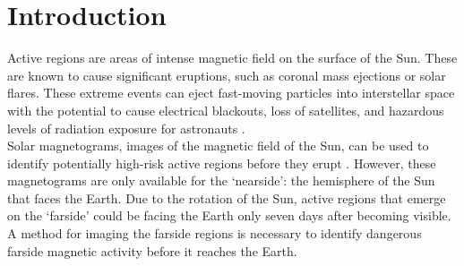 \documentclass[11pt,a4paper,onecolumn]{report}
\begin{document}





\tableofcontents









%
%
%
%
\chapter{Introduction}
%
%
%
%

Active regions are areas of intense magnetic field on the surface of the Sun.
These are known to cause significant eruptions, such as coronal mass ejections
or solar flares. These extreme events can eject fast-moving particles into
interstellar space with the potential to cause electrical blackouts,
loss of satellites, and hazardous levels of radiation exposure for astronauts
\citep{Mewaldt2005, council_severe_2008}. \\

Solar magnetograms, images of the magnetic field of the Sun, can be used to
identify potentially high-risk active regions before they erupt
\citep{bobra_solar_2015}. However, these magnetograms are only available for the
`nearside': the hemisphere of the Sun that faces the Earth. Due to the rotation of
the Sun, active regions that emerge on the `farside' could be facing the Earth
only seven days after becoming visible. A method for imaging the farside
regions is necessary to identify dangerous farside magnetic activity before it
reaches the Earth. \\



\end{document}
